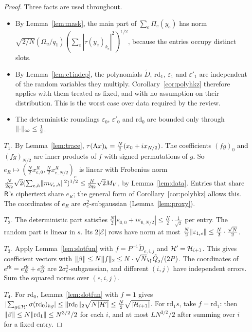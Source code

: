 \begin{proof}
Three facts are used throughout.
\begin{itemize}[nosep]
  \item By Lemma~\ref{lem:mask}, the main part of $\sum_e\Pi_e(y_e)$ has norm $\sqrt{2/N}(\Omega_u/q_1)(\sum_e|\tau(y_e)_{k_e}|^2)^{1/2}$, because the entries occupy distinct slots.
  \item By Lemma~\ref{lem:c1indep}, the polynomials $\tilde D$, $\mathrm{rd}_1$, $\varepsilon_1$ and $\varepsilon'_1$ are independent of the random variables they multiply. Corollary~\ref{cor:polyhkz} therefore applies with them treated as fixed, and with no assumption on their distribution. This is the worst case over data required by the review.
  \item The deterministic roundings $\varepsilon_0$, $\varepsilon'_0$ and $\mathrm{rd}_0$ are bounded only through $\lVert \cdot\rVert_\infty\le\frac12$.
\end{itemize}

\emph{$T_1$.} By Lemma~\ref{lem:trace}, $\tau(\mathrm{A} x)_k=\tfrac N2(x_0+ix_{N/2})$. The coefficients $(fg)_0$ and $(fg)_{N/2}$ are inner products of $f$ with signed permutations of $g$. So $e_R\mapsto(\tfrac N2x^R_{e,0},\tfrac N2x^R_{e,N/2})_e$ is linear with Frobenius norm $\tfrac N{2q_2}\sqrt2(\sum_{e,h}\lVert m_{V_e,h}\rVert^2)^{1/2}\le\tfrac N{2q_2}\sqrt2M_V$, by Lemma~\ref{lem:data}. Entries that share $\mathsf{R}$'s ciphertext share $e_R$; the general form of Corollary~\ref{cor:polyhkz} allows this. The coordinates of $e_R$ are $\sigma_e^2$-subgaussian (Lemma~\ref{lem:proxy}).

\emph{$T_2$.} The deterministic part satisfies $\tfrac N2|\varepsilon_{0,0}+i\varepsilon_{0,N/2}|\le\tfrac N2\cdot\tfrac1{\sqrt2}$ per entry. The random part is linear in $s$. Its $2|\mathcal E|$ rows have norm at most $\tfrac N2\lVert \varepsilon_{1,e}\rVert\le\tfrac N2\cdot\tfrac{\sqrt N}2$.

\emph{$T_3$.} Apply Lemma~\ref{lem:slotfun} with $f=P^{-1}\tilde D_{e,i,j}$ and $\mathcal{H}'=\mathcal{H}_{i+1}$. This gives coefficient vectors with $\lVert \beta\rVert\le N\lVert f\rVert_2\le N\cdot\sqrt N\varsigma_\uparrow\tilde Q_j/(2P)$. The coordinates of $e^{\mathrm{rk}}=e^{\mathrm{rk}}_R+e^{\mathrm{rk}}_O$ are $2\sigma_e^2$-subgaussian, and different $(i,j)$ have independent errors. Sum the squared norms over $(e,i,j)$.

\emph{$T_4$.} For $\mathrm{rd}_0$, Lemma~\ref{lem:slotfun} with $f=1$ gives $|\sum_{g\in\mathcal{H}'}\sigma(\mathrm{rd}_0)_{hg}|\le\lVert \mathrm{rd}_0\rVert_2\sqrt{N|\mathcal{H}'|}\le\tfrac N2\sqrt{|\mathcal{H}_{i+1}|}$. For $\mathrm{rd}_1s$, take $f=\mathrm{rd}_1$: then $\lVert \beta\rVert\le N\lVert \mathrm{rd}_1\rVert\le N^{3/2}/2$ for each $i$, and at most $LN^{3/2}/2$ after summing over $i$ for a fixed entry.


\end{proof}

